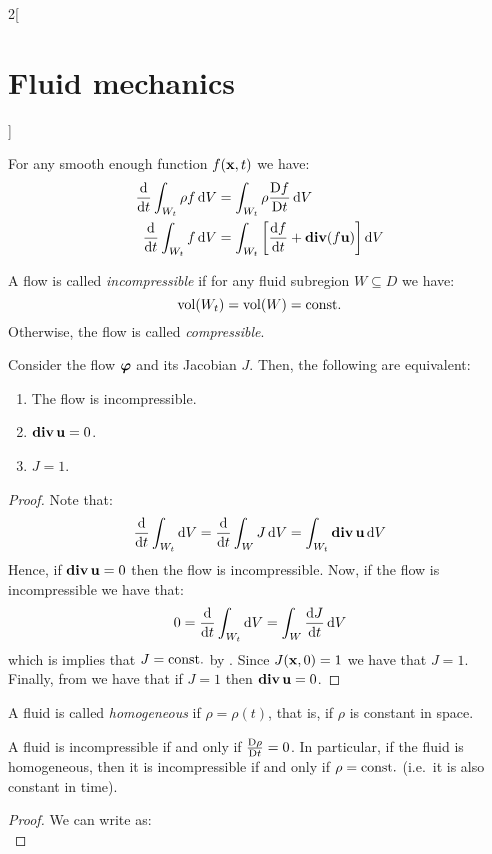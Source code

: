 \documentclass[../../../main_physics.tex]{subfiles}
\begin{document}
\begin{multicols}{2}[\section{Fluid mechanics}]
\begin{corollary}
    For any smooth enough function $f(\boldsymbol{\mathrm{x}},t)$ we have:
    \begin{align*}
      \dv{}{t}\int_{W_t}\rho f\dd{V} & =\int_{W_t}\rho\frac{\mathrm{D}f}{\mathrm{D}t}\dd{V}                     \\
      \dv{}{t}\int_{W_t} f\dd{V}     & =\int_{W_t}\left[\dv{f}{t}+\operatorname{\boldsymbol{\mathrm{div}}}(f\boldsymbol{\mathrm{u}})\right]\dd{V}
    \end{align*}
  \end{corollary}
  \begin{definition}
    A flow is called \emph{incompressible} if for any fluid subregion $W\subseteq D$ we have:
    $$
      \operatorname{vol}(W_t)=\operatorname{vol}(W)=\text{const.}
    $$
    Otherwise, the flow is called \emph{compressible}.
  \end{definition}
  \begin{proposition}\label{FLM:incompressible_eq}
    Consider the flow $\boldsymbol{\mathrm{\varphi}}$ and its Jacobian $J$. Then, the following are equivalent:
    \begin{enumerate}
      \item The flow is incompressible.
      \item $\operatorname{\boldsymbol{\mathrm{div}}}\boldsymbol{\mathrm{u}}=0$.
      \item $J=1$.
    \end{enumerate}
  \end{proposition}
  \begin{proof}
    Note that:
    $$
      \dv{}{t}\int_{W_t}\dd{V}=\dv{}{t}\int_WJ\dd{V}=\int_{W_t}\operatorname{\boldsymbol{\mathrm{div}}}\boldsymbol{\mathrm{u}}\dd{V}
    $$
    Hence, if $\operatorname{\boldsymbol{\mathrm{div}}} \boldsymbol{\mathrm{u}}=0$ then the flow is incompressible. Now, if the flow is incompressible we have that:
    $$
      0=\dv{}{t}\int_{W_t}\dd{V}=\int_W\dv{J}{t}\dd{V}
    $$
    which is implies that $J=\text{const.}$ by . Since $J(\boldsymbol{\mathrm{x}},0)=1$ we have that $J=1$. Finally, from  we have that if $J=1$ then $\operatorname{\boldsymbol{\mathrm{div}}}\boldsymbol{\mathrm{u}}=0$.
  \end{proof}
  \begin{definition}
    A fluid is called \emph{homogeneous} if $\rho=\rho(t)$, that is, if $\rho$ is constant in space.
  \end{definition}
  \begin{proposition}
    A fluid is incompressible if and only if $\frac{\mathrm{D}\rho}{\mathrm{D}t}=0$. In particular, if the fluid is homogeneous, then it is incompressible if and only if $\rho=\text{const.}$ (i.e.\ it is also constant in time).
  \end{proposition}
  \begin{proof}
    We can write  as:
    $$
$$
\end{proof}
\end{multicols}
\end{document}
